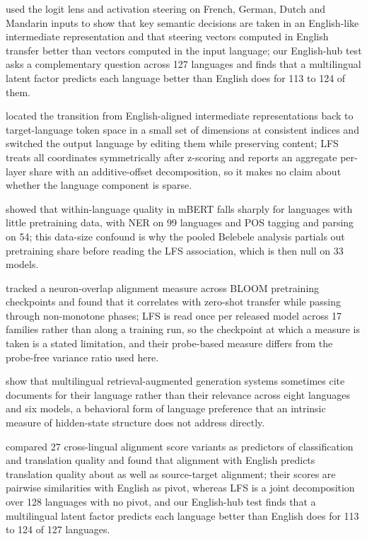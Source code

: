\documentclass{article} %
\begin{document}
\citet{schut2025english} used the logit lens and activation steering on French, German, Dutch and Mandarin inputs to show that key semantic decisions are taken in an English-like intermediate representation and that steering vectors computed in English transfer better than vectors computed in the input language; our English-hub test asks a complementary question across 127 languages and finds that a multilingual latent factor predicts each language better than English does for 113 to 124 of them.

\citet{zhong2026sparse} located the transition from English-aligned intermediate representations back to target-language token space in a small set of dimensions at consistent indices and switched the output language by editing them while preserving content; LFS treats all coordinates symmetrically after z-scoring and reports an aggregate per-layer share with an additive-offset decomposition, so it makes no claim about whether the language component is sparse.

\citet{wu2020equal} showed that within-language quality in mBERT falls sharply for languages with little pretraining data, with NER on 99 languages and POS tagging and parsing on 54; this data-size confound is why the pooled Belebele analysis partials out pretraining share before reading the LFS association, which is then null on 33 models.

\citet{wang2024emergence} tracked a neuron-overlap alignment measure across BLOOM pretraining checkpoints and found that it correlates with zero-shot transfer while passing through non-monotone phases; LFS is read once per released model across 17 families rather than along a training run, so the checkpoint at which a measure is taken is a stated limitation, and their probe-based measure differs from the probe-free variance ratio used here.

\citet{ki2025nepotism} show that multilingual retrieval-augmented generation systems sometimes cite documents for their language rather than their relevance across eight languages and six models, a behavioral form of language preference that an intrinsic measure of hidden-state structure does not address directly.

\citet{alali2026english} compared 27 cross-lingual alignment score variants as predictors of classification and translation quality and found that alignment with English predicts translation quality about as well as source-target alignment; their scores are pairwise similarities with English as pivot, whereas LFS is a joint decomposition over 128 languages with no pivot, and our English-hub test finds that a multilingual latent factor predicts each language better than English does for 113 to 124 of 127 languages.
\end{document}
